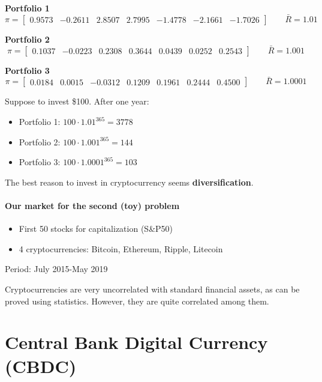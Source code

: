 \textbf{Portfolio 1}
\[
	\pi = \begin{bmatrix}
	0.9573 & -0.2611 &  2.8507 &  2.7995 & -1.4778 & -2.1661 & -1.7026
	\end{bmatrix}
	\qquad
	\bar{R} = 1.01
\]

\textbf{Portfolio 2}
\[
	\pi = \begin{bmatrix}
	0.1037 & -0.0223 &  0.2308 &  0.3644 &  0.0439 &  0.0252 &  0.2543
	\end{bmatrix}
	\qquad
	\bar{R} = 1.001
\]

\textbf{Portfolio 3}
\[
	\pi = \begin{bmatrix}
	0.0184 &  0.0015 & -0.0312 &  0.1209 &  0.1961 &  0.2444 &  0.4500
	\end{bmatrix}
	\qquad
	\bar{R} = 1.0001
\]

Suppose to invest \$100. After one year:
\begin{itemize}
	\item Portfolio 1: $100 \cdot 1.01^{365} = 3778$
	\item Portfolio 2: $100 \cdot 1.001^{365} = 144$
	\item Portfolio 3: $100 \cdot 1.0001^{365} = 103$
\end{itemize}

The best reason to invest in cryptocurrency seems \textbf{diversification}.

\paragraph{Our market for the second (toy) problem}

\begin{itemize}
	\item First 50 stocks for capitalization (S\&P50)
	\item 4 cryptocurrencies: Bitcoin, Ethereum, Ripple, Litecoin
\end{itemize}

Period: July 2015-May 2019


Cryptocurrencies are very uncorrelated with standard financial assets, as can be proved using statistics. However, they are quite correlated among them.



\section{Central Bank Digital Currency (CBDC)}

